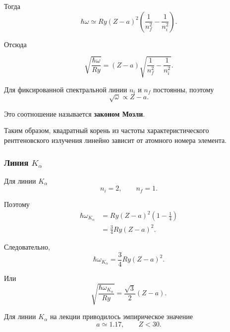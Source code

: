 \documentclass[../final.tex]{subfiles}
\begin{document}
Тогда
\begin{equation*}
    \hbar\omega
    \simeq
    Ry(Z-a)^2
    \left(
        \frac{1}{n_f^2}
        -
        \frac{1}{n_i^2}
    \right).
\end{equation*}

Отсюда

\begin{equation*}
    \boxed{
        \sqrt{\frac{\hbar\omega}{Ry}}
        =
        (Z-a)
        \sqrt{
            \frac{1}{n_f^2}
            -
            \frac{1}{n_i^2}
        }
    }.
\end{equation*}


Для фиксированной спектральной линии \(n_i\) и \(n_f\) постоянны,
поэтому
\begin{equation*}
    \boxed{
        \sqrt{\omega}
        \propto
        Z-a
    }.
\end{equation*}

Это соотношение называется \textbf{законом Мозли}.

Таким образом, квадратный корень из частоты характеристического
рентгеновского излучения линейно зависит от атомного номера элемента.

\subsubsection{Линия \(K_\alpha\)}

Для линии \(K_\alpha\)
\begin{equation*}
    n_i=2,
    \qquad
    n_f=1.
\end{equation*}

Поэтому
\begin{align*}
    \hbar\omega_{K_\alpha}
    &=
    Ry(Z-a)^2
    \left(
        1-\frac14
    \right)
    \\
    &=
    \frac34
    Ry(Z-a)^2.
\end{align*}

Следовательно,
\begin{equation*}
    \boxed{
        \hbar\omega_{K_\alpha}
        =
        \frac34
        Ry(Z-a)^2
    }.
\end{equation*}

Или
\begin{equation*}
    \boxed{
        \sqrt{
            \frac{\hbar\omega_{K_\alpha}}{Ry}
        }
        =
        \frac{\sqrt3}{2}(Z-a)
    }.
\end{equation*}

Для линии \(K_\alpha\) на лекции приводилось эмпирическое значение
\begin{equation*}
    a\simeq1.17,
    \qquad
    Z<30.
\end{equation*}
\end{document}
